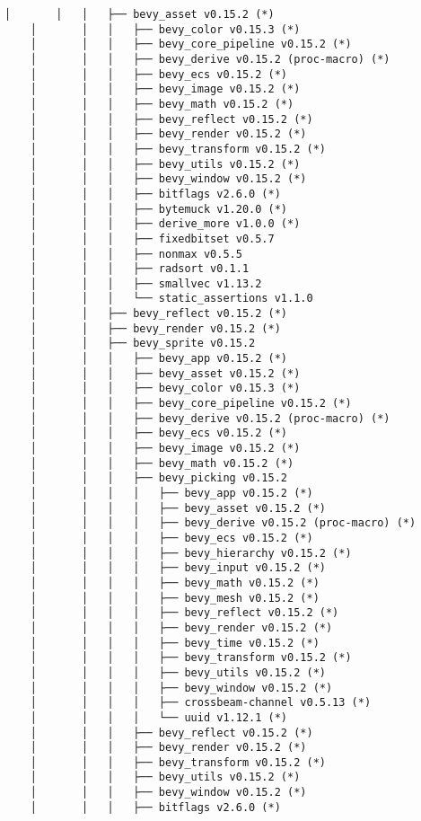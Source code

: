 \begin{lstlisting}[style=mystyle, caption={dependencias del proyecto}, label={lst:dependencias}]
    │       │   │   ├── bevy_asset v0.15.2 (*)
    │       │   │   ├── bevy_color v0.15.3 (*)
    │       │   │   ├── bevy_core_pipeline v0.15.2 (*)
    │       │   │   ├── bevy_derive v0.15.2 (proc-macro) (*)
    │       │   │   ├── bevy_ecs v0.15.2 (*)
    │       │   │   ├── bevy_image v0.15.2 (*)
    │       │   │   ├── bevy_math v0.15.2 (*)
    │       │   │   ├── bevy_reflect v0.15.2 (*)
    │       │   │   ├── bevy_render v0.15.2 (*)
    │       │   │   ├── bevy_transform v0.15.2 (*)
    │       │   │   ├── bevy_utils v0.15.2 (*)
    │       │   │   ├── bevy_window v0.15.2 (*)
    │       │   │   ├── bitflags v2.6.0 (*)
    │       │   │   ├── bytemuck v1.20.0 (*)
    │       │   │   ├── derive_more v1.0.0 (*)
    │       │   │   ├── fixedbitset v0.5.7
    │       │   │   ├── nonmax v0.5.5
    │       │   │   ├── radsort v0.1.1
    │       │   │   ├── smallvec v1.13.2
    │       │   │   └── static_assertions v1.1.0
    │       │   ├── bevy_reflect v0.15.2 (*)
    │       │   ├── bevy_render v0.15.2 (*)
    │       │   ├── bevy_sprite v0.15.2
    │       │   │   ├── bevy_app v0.15.2 (*)
    │       │   │   ├── bevy_asset v0.15.2 (*)
    │       │   │   ├── bevy_color v0.15.3 (*)
    │       │   │   ├── bevy_core_pipeline v0.15.2 (*)
    │       │   │   ├── bevy_derive v0.15.2 (proc-macro) (*)
    │       │   │   ├── bevy_ecs v0.15.2 (*)
    │       │   │   ├── bevy_image v0.15.2 (*)
    │       │   │   ├── bevy_math v0.15.2 (*)
    │       │   │   ├── bevy_picking v0.15.2
    │       │   │   │   ├── bevy_app v0.15.2 (*)
    │       │   │   │   ├── bevy_asset v0.15.2 (*)
    │       │   │   │   ├── bevy_derive v0.15.2 (proc-macro) (*)
    │       │   │   │   ├── bevy_ecs v0.15.2 (*)
    │       │   │   │   ├── bevy_hierarchy v0.15.2 (*)
    │       │   │   │   ├── bevy_input v0.15.2 (*)
    │       │   │   │   ├── bevy_math v0.15.2 (*)
    │       │   │   │   ├── bevy_mesh v0.15.2 (*)
    │       │   │   │   ├── bevy_reflect v0.15.2 (*)
    │       │   │   │   ├── bevy_render v0.15.2 (*)
    │       │   │   │   ├── bevy_time v0.15.2 (*)
    │       │   │   │   ├── bevy_transform v0.15.2 (*)
    │       │   │   │   ├── bevy_utils v0.15.2 (*)
    │       │   │   │   ├── bevy_window v0.15.2 (*)
    │       │   │   │   ├── crossbeam-channel v0.5.13 (*)
    │       │   │   │   └── uuid v1.12.1 (*)
    │       │   │   ├── bevy_reflect v0.15.2 (*)
    │       │   │   ├── bevy_render v0.15.2 (*)
    │       │   │   ├── bevy_transform v0.15.2 (*)
    │       │   │   ├── bevy_utils v0.15.2 (*)
    │       │   │   ├── bevy_window v0.15.2 (*)
    │       │   │   ├── bitflags v2.6.0 (*)

\end{lstlisting}
